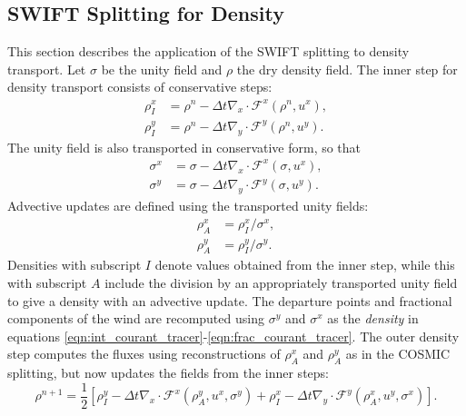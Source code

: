 \documentclass{ametsocV6.1}
\begin{document}
\subsection{SWIFT Splitting for Density} \label{sec:swift_density}
This section describes the application of the SWIFT splitting to density transport.
Let $\sigma$ be the unity field and $\rho$ the dry density field.
The inner step for density transport consists of conservative steps:
\begin{subequations}
\begin{align} \label{eqn:swift_density_x}
    \rho_I^x &= \rho^n - \Delta{t} \nabla_x\cdot \mathcal{F}^x(\rho^n, u^x), \\
    \rho_I^y &= \rho^n - \Delta{t} \nabla_y\cdot \mathcal{F}^y(\rho^n, u^y).
\end{align}
\end{subequations}
The unity field is also transported in conservative form, so that
\begin{subequations} \label{eqn:sigma_x_sigma_y}
\begin{align}
    \sigma^x &= \sigma - \Delta{t} \nabla_x\cdot \mathcal{F}^x(\sigma, u^x), \\
    \sigma^y &= \sigma - \Delta{t} \nabla_y\cdot \mathcal{F}^y(\sigma, u^y).
\end{align}
\end{subequations}
Advective updates are defined using the transported unity fields:
\begin{subequations}
\begin{align} \label{eqn:swift_density_adv_x}
    \rho^x_A &= \rho_I^x / \sigma^x, \\ \label{eqn:swift_density_adv_y}
    \rho^y_A &= \rho_I^y / \sigma^y.
\end{align}
\end{subequations}
Densities with subscript $I$ denote values obtained from the inner step, while this with subscript $A$ include the division by an appropriately transported unity field to give a density with an advective update.
The departure points and fractional components of the wind are recomputed using $\sigma^y$ and $\sigma^x$ as the \textit{density} in equations \eqref{eqn:int_courant_tracer}-\eqref{eqn:frac_courant_tracer}.
The outer density step computes the fluxes using reconstructions of $\rho^x_A$ and $\rho^y_A$ as in the COSMIC splitting, but now updates the fields from the inner steps:
\begin{equation} \label{eqn:swift_density}
\rho^{n+1} = \frac{1}{2}\left[\rho_I^{y} - \Delta{t}\nabla_x\cdot \mathcal{F}^x(\rho^y_A, u^x, \sigma^y) + \rho_I^x - \Delta{t}\nabla_y\cdot \mathcal{F}^y(\rho^x_A, u^y, \sigma^x)\right].
\end{equation}
\end{document}

